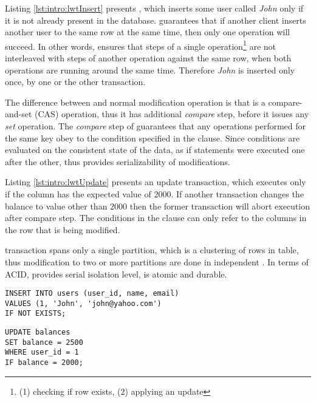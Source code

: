 Listing \ref{lst:intro:lwtInsert} presents \lwt, which inserts some user called \emph{John} only if it is not already present in the database. \lwt  guarantees that if another client inserts another user to the same row at the same time, then only one operation will succeed. In other words, \lwt ensures that steps of a single operation\footnote{(1) checking if row exists, (2) applying an update} are not interleaved with steps of another operation against the same row, when both operations are running around the same time. Therefore \emph{John} is inserted only once, by one or the other transaction.

The difference between \lwt and normal modification operation is that \lwt is a compare-and-set (CAS) operation, thus it has additional \emph{compare} step, before it issues any \emph{set} operation.
The \emph{compare} step of \lwt guarantees that any operations performed for the same key obey to the condition specified in the  clause. Since conditions are evaluated on the consistent state of the data, as if statements were executed one after the other, thus provides serializability of modifications.

Listing \ref{lst:intro:lwtUpdate} presents an update transaction, which executes only if the  column has the expected value of $2000$. If another transaction changes the balance to value other than $2000$ then the former transaction will abort execution after compare step. The conditions in the  clause can only refer to the columns in the row that is being modified.

\lwt transaction spans only a single partition, which is a clustering of rows in  table, thus modification to two or more partitions are done in independent \lwt. In terms of ACID, \lwt provides serial isolation level, is atomic and durable. 

\begin{example}
\label{lst:intro:lwtInsert}
\begin{lstlisting}[style=outcode,caption={LWT Insert with \code{IF NOT EXISTS} clause}]
INSERT INTO users (user_id, name, email)  
VALUES (1, 'John', 'john@yahoo.com') 
IF NOT EXISTS;
\end{lstlisting}
\end{example}

\begin{example}
\label{lst:intro:lwtUpdate}
\begin{lstlisting}[style=outcode,caption={LWT Update with column condition}]
UPDATE balances 
SET balance = 2500 
WHERE user_id = 1
IF balance = 2000;
\end{lstlisting}
\end{example}


